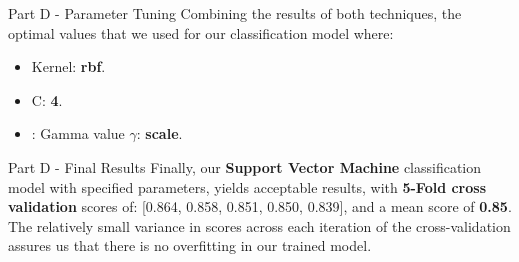 \documentclass{beamer}
\begin{document}
    \begin{frame}{Part D - Parameter Tuning}
    Combining the results of both techniques, the optimal values that we used for our classification model where:
    \begin{itemize}
        \item Kernel: \textbf{rbf}.
        \item C: \textbf{4}.
        \item: Gamma value $\gamma$: \textbf{scale}.
    \end{itemize}
    \end{frame}

    \begin{frame}{Part D - Final Results}
    Finally, our \textbf{Support Vector Machine} classification model with specified parameters, yields acceptable results, with
    \textbf{5-Fold cross validation} scores of: [0.864, 0.858, 0.851, 0.850, 0.839], and a mean score of \textbf{0.85}.
    The relatively small variance in scores across each iteration of the cross-validation assures us that there is no
    overfitting in our trained model.
    \end{frame}
    
\end{document}
